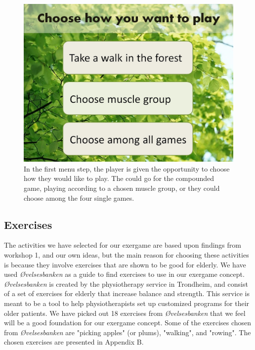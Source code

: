 \begin{figure} [H]
\centering
\includegraphics[scale=0.45]{choosePlay.jpg}
\caption[The menu - start]{In the first menu step, the player is given the opportunity to choose how they would like to play. The could go for the compounded game, playing according to a chosen muscle group, or they could choose among the four single games.}
\label{fig:menuStart}
\end{figure} 

\subsection{Exercises}
The activities we have selected for our exergame are based upon findings from workshop 1, and our own ideas, but the main reason for choosing these activities is because they involve exercises that are shown to be good for elderly. We have used \emph{Øvelsesbanken} \cite{eldretrening} as a guide to find exercises to use in our exergame concept. \emph{Øvelsesbanken} is created by the physiotherapy service in Trondheim, and consist of a set of exercises for elderly that increase balance and strength. This service is meant to be a tool to help physiotherapists set up customized programs for their older patients. We have picked out 18 exercises from \emph{Øvelsesbanken} that we feel will be a good foundation for our exergame concept. Some of the exercises chosen from \emph{Øvelsesbanken} are "picking apples" (or plums), "walking", and "rowing". The chosen exercises are presented in Appendix B. 


